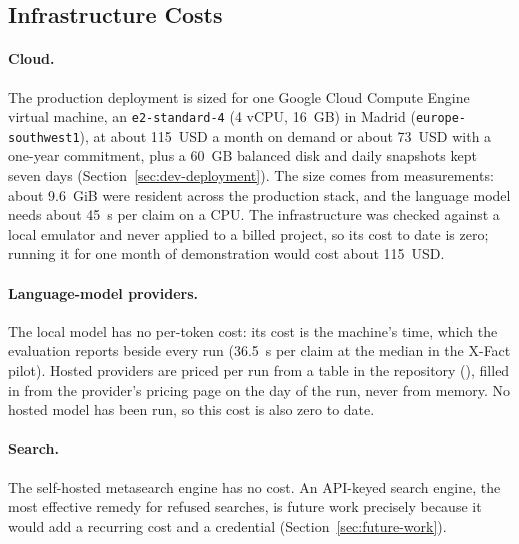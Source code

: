 
\subsection{Infrastructure Costs}

\paragraph{Cloud.} The production deployment is sized for one Google
Cloud Compute Engine virtual machine, an \texttt{e2-standard-4} (4 vCPU,
16~GB) in Madrid (\texttt{europe-southwest1}), at about 115~USD a month
on demand or about 73~USD with a one-year commitment, plus a 60~GB
balanced disk and daily snapshots kept seven days
(Section~\ref{sec:dev-deployment}). The size comes from measurements:
about 9.6~GiB were resident across the production stack, and the
language model needs about 45~s per claim on a CPU. The infrastructure
was checked against a local emulator and never applied to a billed
project, so its cost to date is zero; running it for one month of
demonstration would cost about 115~USD.

\paragraph{Language-model providers.} The local model has no per-token
cost: its cost is the machine's time, which the evaluation reports
beside every run (36.5~s per claim at the median in the X-Fact pilot).
Hosted providers are priced per run from a table in the repository
(), filled in from the
provider's pricing page on the day of the run, never from memory. No
hosted model has been run, so this cost is also zero to date.

\paragraph{Search.} The self-hosted metasearch engine has no cost. An
API-keyed search engine, the most effective remedy for refused searches,
is future work precisely because it would add a recurring cost and a
credential (Section~\ref{sec:future-work}).
